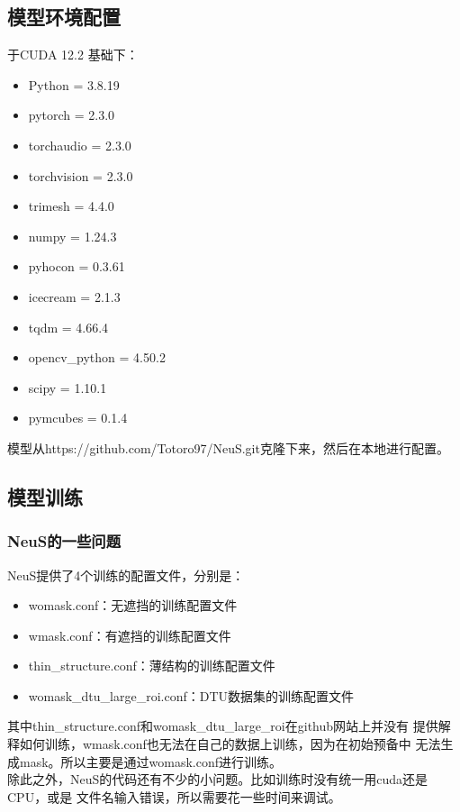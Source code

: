\documentclass{nwputhesis}
\begin{document}
\subsection{模型环境配置}
\noindent 于CUDA 12.2 基础下：
\begin{itemize}
    \item Python = 3.8.19
    \item pytorch = 2.3.0
    \item torchaudio = 2.3.0
    \item torchvision = 2.3.0
    \item trimesh = 4.4.0
    \item numpy = 1.24.3
    \item pyhocon = 0.3.61
    \item icecream = 2.1.3
    \item tqdm = 4.66.4
    \item opencv\_python = 4.50.2
    \item scipy = 1.10.1
    \item pymcubes = 0.1.4
\end{itemize}

\indent
模型从{https://github.com/Totoro97/NeuS.git}克隆下来，然后在本地进行配置。

\subsection{模型训练}
\subsubsection{NeuS的一些问题}
\indent
NeuS提供了4个训练的配置文件，分别是：
\begin{itemize}
    \item womask.conf：无遮挡的训练配置文件
    \item wmask.conf：有遮挡的训练配置文件
    \item thin\_structure.conf：薄结构的训练配置文件
    \item womask\_dtu\_large\_roi.conf：DTU数据集的训练配置文件
\end{itemize}

\indent
其中thin\_structure.conf和womask\_dtu\_large\_roi在github网站上并没有
提供解释如何训练，wmask.conf也无法在自己的数据上训练，因为在初始预备中
无法生成mask。所以主要是通过womask.conf进行训练。\\
\indent
除此之外，NeuS的代码还有不少的小问题。比如训练时没有统一用cuda还是CPU，或是
文件名输入错误，所以需要花一些时间来调试。\\
\end{document}
